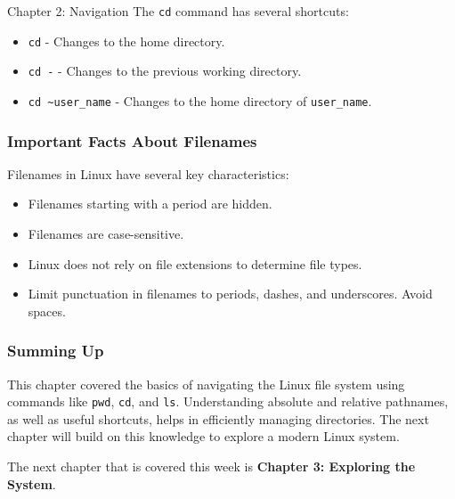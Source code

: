 \begin{notes}{Chapter 2: Navigation}
    The \texttt{cd} command has several shortcuts:
    \begin{itemize}
        \item \texttt{cd} - Changes to the home directory.
        \item \texttt{cd -} - Changes to the previous working directory.
        \item \texttt{cd \textasciitilde user\_name} - Changes to the home directory of \texttt{user\_name}.
    \end{itemize}

    \subsubsection*{Important Facts About Filenames}

    Filenames in Linux have several key characteristics:
    \begin{itemize}
        \item Filenames starting with a period are hidden.
        \item Filenames are case-sensitive.
        \item Linux does not rely on file extensions to determine file types.
        \item Limit punctuation in filenames to periods, dashes, and underscores. Avoid spaces.
    \end{itemize}

    \subsubsection*{Summing Up}

    This chapter covered the basics of navigating the Linux file system using commands like \texttt{pwd}, \texttt{cd}, and \texttt{ls}. Understanding absolute and relative pathnames, as well as useful 
    shortcuts, helps in efficiently managing directories. The next chapter will build on this knowledge to explore a modern Linux system.
\end{notes}

The next chapter that is covered this week is \textbf{Chapter 3: Exploring the System}.

